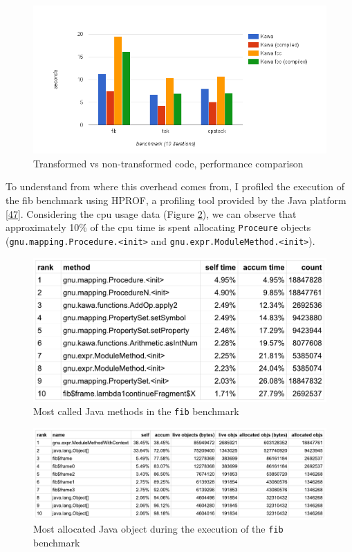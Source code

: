 \documentclass[12pt,a4paper,oneside,openright]{book}
\begin{document}
\begin{figure}[htbp]
\centering
\includegraphics{figures/overhead.png}
\caption{Transformed vs non-transformed code, performance comparison
\label{overhead}}
\end{figure}

To understand from where this overhead comes from, I profiled the
execution of the fib benchmark using HPROF, a profiling tool provided by
the Java platform {[}\hyperref[ref-HPROF2015]{47}{]}. Considering the
cpu usage data (Figure \ref{cpu}), we can observe that approximately
10\% of the cpu time is spent allocating \texttt{Proceure} objects
(\texttt{gnu.mapping.Procedure.\textless{}init\textgreater{}} and
\texttt{gnu.expr.ModuleMethod.\textless{}init\textgreater{}}).

\begin{figure}[htbp]
\centering
\includegraphics{figures/cpu.pdf}
\caption{Most called Java methods in the \texttt{fib} benchmark
\label{cpu}}
\end{figure}

\begin{figure}[htbp]
\centering
\includegraphics{figures/heap.pdf}
\caption{Most allocated Java object during the execution of the
\texttt{fib} benchmark \label{heap}}
\end{figure}
\end{document}
